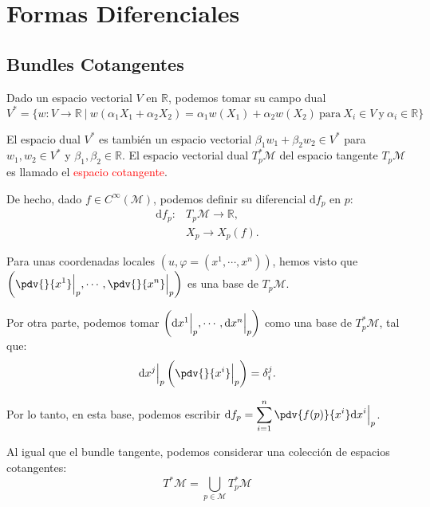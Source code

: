 \documentclass[../main]{subfiles}
\begin{document}
\section{Formas Diferenciales}
\subsection{Bundles Cotangentes}
Dado un espacio vectorial $V$ en $\mathbb{R}$, podemos tomar su campo dual 
\begin{equation}
    V^{*}=\{w: V\rightarrow \mathbb{R}\ | \ w(\alpha_1 X_1+\alpha_2 X_2)=\alpha_1 w(X_1)+\alpha_2 w(X_2) \ \text{para} \ X_i \in V \ \text{y} \ \alpha_i \in \mathbb{R}\}
\end{equation}

El espacio dual $V^{*}$ es también un espacio vectorial $\beta_1 w_1+\beta_2 w_2 \in V^{*}$ para $w_1, w_2 \in V^{*}$ y $\beta_1, \beta_2 \in \mathbb{R}$. El espacio vectorial dual $T^{*}_p \mathcal{M}$ del espacio tangente $T_p \mathcal{M}$ es llamado el \textcolor{red}{espacio cotangente}.

De hecho, dado $f \in C^{\infty}(\mathcal{M})$, podemos definir su diferencial $\mathrm{d}f_p$ en $p$:
\begin{equation}
    \begin{split}
        \mathrm{d}f_p:& T_p \mathcal{M} \rightarrow \mathbb{R},\\
        & X_p \rightarrow X_p(f).
    \end{split}
\end{equation}

Para unas coordenadas locales $(u, \varphi=(x^1, \cdots, x^n))$, hemos visto que $\displaystyle \left(\pdv{}{x^1}\Big{|}_p, \cdots, \pdv{}{x^n}\Big{|}_p\right)$ es una base de $T_p\mathcal{M}$.

Por otra parte, podemos tomar $\left(\mathrm{d}x^1\Big{|}_p, \cdots, \mathrm{d}x^n\Big{|}_p\right)$ como una base de $T^{*}_p \mathcal{M}$, tal que: 
\begin{equation}
    \mathrm{d}x^j\Big{|}_p \left(\pdv{}{x^{i}}\Big{|}_p\right)=\delta^j_i.
\end{equation}

Por lo tanto, en esta base, podemos escribir $\displaystyle\mathrm{d}f_p=\sum_{i=1}^n \pdv{f(p)}{x^{i}}\mathrm{d}x^{i}\Big{|}_p$.

Al igual que el bundle tangente, podemos considerar una colección de espacios cotangentes:
\begin{equation}
    T^{*}\mathcal{M}=\bigcup_{p \in \mathcal{M}} T^{*}_p \mathcal{M}
\end{equation}
\end{document}
